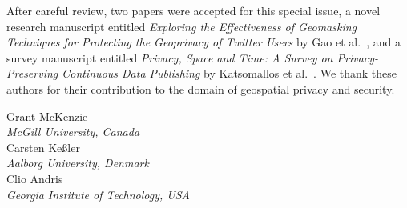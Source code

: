 \documentclass{josised}
\begin{document}
After careful review, two papers were accepted for this special issue, a novel research manuscript entitled \textit{Exploring the Effectiveness of Geomasking Techniques for Protecting the Geoprivacy of Twitter Users} by Gao et al.~\cite{gao2019exploring}, and a survey manuscript entitled \textit{Privacy, Space and Time: A Survey on Privacy-Preserving Continuous Data Publishing} by Katsomallos et al.~\cite{katsomallos2019privacy}.  We thank these authors for their contribution to the domain of geospatial privacy and security.



\bigskip

\bigskip

\begin{raggedleft}
Grant McKenzie\\
\textit{McGill University, Canada} \\
\bigskip
Carsten Ke{\ss}ler\\
\textit{Aalborg University, Denmark} \\
\bigskip
Clio Andris\\
\textit{Georgia Institute of Technology, USA} \\






\end{raggedleft}
\end{document}
